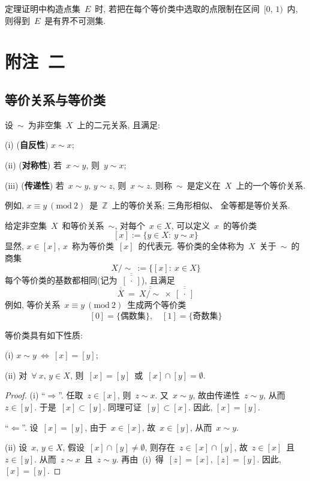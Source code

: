 \begin{remark}
定理证明中构造点集~$E$~时, 若把在每个等价类中选取的点限制在区间~$[0,\,1)$~内,
则得到~$E$~是有界不可测集.
\end{remark}

\newpage

\section*{附注~二}

\subsection*{等价关系与等价类}

\begin{definition}
设~$\sim$~为非空集~$X$~上的二元关系, 且满足:

(i) (\textbf{自反性}) $x \sim x$;

(ii) (\textbf{对称性}) 若~$x \sim y$, 则~$y \sim x$;

(iii) (\textbf{传递性}) 若~$x \sim y, \, y \sim z$, 则~$x \sim z$.
则称~$\sim$~是定义在~$X$~上的一个等价关系.
\end{definition}

例如, $x \equiv y ~(\mathrm{mod~} 2)$~是~$\mathbb{Z}$~上的等价关系; 三角形相似、
全等都是等价关系.

给定非空集~$X$~和等价关系~$\sim$, 对每个~$x \in X$, 可以定义~$x$~的等价类
\[
[x] := \{y \in X: \: y \sim x\}
\]
显然, $x \in [x]$, $x$~称为等价类~$[x]$~的代表元. 等价类的全体称为~$X$~关于~$\sim$~的商集
\[
X/\sim ~:= \{[x]:\: x \in X\}
\]
每个等价类的基数都相同(记为~$\overline{\overline{[~\!\cdot~\!]}}$), 且满足
\[
\overline{\overline{X}}  ~=~ \overline{\overline{X/\sim}}  ~\times~
\overline{\overline{[~\!\cdot~\!]}}
\]
例如, 等价关系~$x \equiv y ~(\mathrm{mod~} 2)$~生成两个等价类
\[
[0] = \{\mbox{偶数集}\}, \quad [1] = \{\mbox{奇数集}\}
\]

\begin{proposition}
等价类具有如下性质:

(i) $x \sim y~\Leftrightarrow~[x] = [y]$;

(ii) 对~$\forall~x, \, y \in X$, 则~$[x] = [y]$~或~$[x] \cap [y]
= \emptyset$.
\end{proposition}

\begin{proof}
(i) ``$\Rightarrow$''. 任取~$z \in [x]$, 则~$z \sim x$. 又~$x \sim y$,
故由传递性~$z \sim y$, 从而~$z \in [y]$. 于是~$[x] \subset [y]$.
同理可证~$[y] \subset [x]$. 因此, $[x] = [y]$.

``$\Leftarrow$''. 设~$[x] = [y]$, 由于~$x \in [x]$, 故~$x \in [y]$, 从而~$x \sim y$.

(ii) 设~$x, \, y \in X$, 假设~$[x] \cap [y] \neq \emptyset$, 则存在~$z \in [x] \cap [y]$,
故~$z \in [x]$~且~$z \in [y]$. 从而~$z \sim x$~且~$z \sim y$. 再由~(i)~得~$[z] = [x],
\, [z] = [y]$. 因此, $[x] = [y]$.
\end{proof}


